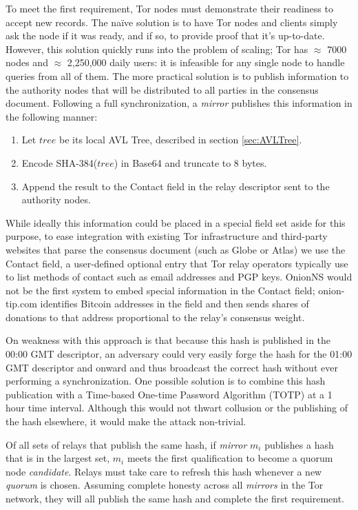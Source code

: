 To meet the first requirement, Tor nodes must demonstrate their readiness to accept new records. The na\"{i}ve solution is to have Tor nodes and clients simply ask the node if it was ready, and if so, to provide proof that it's up-to-date. However, this solution quickly runs into the problem of scaling; Tor has $ \approx $ 7000 nodes and $ \approx $ 2,250,000 daily users\cite{TorMetrics}: it is infeasible for any single node to handle queries from all of them. The more practical solution is to publish information to the authority nodes that will be distributed to all parties in the consensus document. Following a full synchronization, a \emph{mirror} publishes this information in the following manner:

\begin{enumerate}
	\item Let $ tree $ be its local AVL Tree, described in section \ref{sec:AVLTree}.
	\item Encode SHA-384($ tree $) in Base64 and truncate to 8 bytes.
	\item Append the result to the Contact field in the relay descriptor sent to the authority nodes.
\end{enumerate}

While ideally this information could be placed in a special field set aside for this purpose, to ease integration with existing Tor infrastructure and third-party websites that parse the consensus document (such as Globe or Atlas) we use the Contact field, a user-defined optional entry that Tor relay operators typically use to list methods of contact such as email addresses and PGP keys. OnionNS would not be the first system to embed special information in the Contact field; onion-tip.com identifies Bitcoin addresses in the field and then sends shares of donations to that address proportional to the relay's consensus weight.

On weakness with this approach is that because this hash is published in the 00:00 GMT descriptor, an adversary could very easily forge the hash for the 01:00 GMT descriptor and onward and thus broadcast the correct hash without ever performing a synchronization. One possible solution is to combine this hash publication with a Time-based One-time Password Algorithm (TOTP) at a 1 hour time interval. Although this would not thwart collusion or the publishing of the hash elsewhere, it would make the attack non-trivial.

Of all sets of relays that publish the same hash, if \emph{mirror} $ m_{i} $ publishes a hash that is in the largest set, $ m_{i} $ meets the first qualification to become a quorum node \emph{candidate}. Relays must take care to refresh this hash whenever a new \emph{quorum} is chosen. Assuming complete honesty across all \emph{mirrors} in the Tor network, they will all publish the same hash and complete the first requirement.

